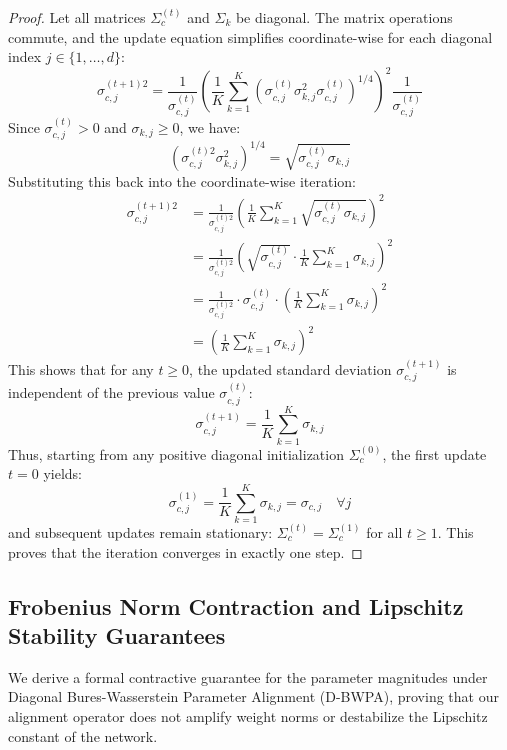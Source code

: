 \documentclass{article}
\theoremstyle{plain}
\theoremstyle{definition}
\theoremstyle{remark}
\begin{document}
\begin{proof}
Let all matrices $\Sigma_c^{(t)}$ and $\Sigma_k$ be diagonal. The matrix operations commute, and the update equation simplifies coordinate-wise for each diagonal index $j \in \{1, \dots, d\}$:
\begin{equation}
  \sigma_{c, j}^{(t+1)2} = \frac{1}{\sigma_{c, j}^{(t)}} \left( \frac{1}{K} \sum_{k=1}^K \left( \sigma_{c, j}^{(t)} \sigma_{k, j}^2 \sigma_{c, j}^{(t)} \right)^{1/4} \right)^2 \frac{1}{\sigma_{c, j}^{(t)}}
\end{equation}
Since $\sigma_{c, j}^{(t)} > 0$ and $\sigma_{k, j} \ge 0$, we have:
\begin{equation}
  \left( \sigma_{c, j}^{(t)2} \sigma_{k, j}^2 \right)^{1/4} = \sqrt{\sigma_{c, j}^{(t)} \sigma_{k, j}}
\end{equation}
Substituting this back into the coordinate-wise iteration:
\begin{equation}
\begin{split}
  \sigma_{c, j}^{(t+1)2} &= \frac{1}{\sigma_{c, j}^{(t)2}} \left( \frac{1}{K} \sum_{k=1}^K \sqrt{\sigma_{c, j}^{(t)} \sigma_{k, j}} \right)^2 \\
  &= \frac{1}{\sigma_{c, j}^{(t)2}} \left( \sqrt{\sigma_{c, j}^{(t)}} \cdot \frac{1}{K} \sum_{k=1}^K \sigma_{k, j} \right)^2 \\
  &= \frac{1}{\sigma_{c, j}^{(t)2}} \cdot \sigma_{c, j}^{(t)} \cdot \left( \frac{1}{K} \sum_{k=1}^K \sigma_{k, j} \right)^2 \\
  &= \left( \frac{1}{K} \sum_{k=1}^K \sigma_{k, j} \right)^2
\end{split}
\end{equation}
This shows that for any $t \ge 0$, the updated standard deviation $\sigma_{c, j}^{(t+1)}$ is independent of the previous value $\sigma_{c, j}^{(t)}$:
\begin{equation}
  \sigma_{c, j}^{(t+1)} = \frac{1}{K} \sum_{k=1}^K \sigma_{k, j}
\end{equation}
Thus, starting from any positive diagonal initialization $\Sigma_c^{(0)}$, the first update $t = 0$ yields:
\begin{equation}
  \sigma_{c, j}^{(1)} = \frac{1}{K} \sum_{k=1}^K \sigma_{k, j} = \sigma_{c, j} \quad \forall j
\end{equation}
and subsequent updates remain stationary: $\Sigma_c^{(t)} = \Sigma_c^{(1)}$ for all $t \ge 1$. This proves that the iteration converges in exactly one step.
\end{proof}

\subsection{Frobenius Norm Contraction and Lipschitz Stability Guarantees}
We derive a formal contractive guarantee for the parameter magnitudes under Diagonal Bures-Wasserstein Parameter Alignment (D-BWPA), proving that our alignment operator does not amplify weight norms or destabilize the Lipschitz constant of the network.
\end{document}
